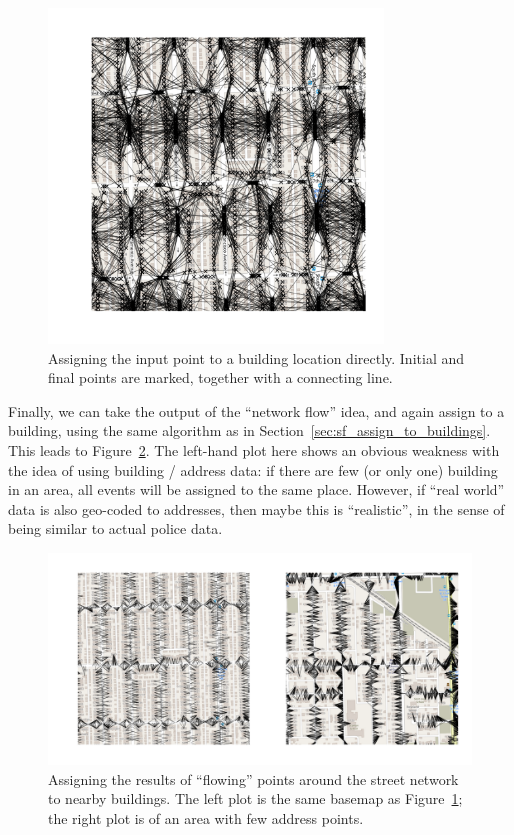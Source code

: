 \documentclass[twoside,a4paper,twocolumn,10pt]{article}
\theoremstyle{plain}
\theoremstyle{definition}
\begin{document}
\begin{figure}
  \includegraphics[width=3.5in]{chicago_buildings_1.png}
  \caption{Assigning the input point to a building location directly.  Initial and final
points are marked, together with a connecting line.}
  \label{fig:chicago_buildings_1}
\end{figure}

Finally, we can take the output of the ``network flow'' idea, and again assign
to a building, using the same algorithm as in Section~\ref{sec:sf_assign_to_buildings}.
This leads to Figure~\ref{fig:chicago_buildings_2}.  The left-hand plot here shows an
obvious weakness with the idea of using building / address data: if there are few (or only one)
building in an area, all events will be assigned to the same place.  However, if ``real world''
data is also geo-coded to addresses, then maybe this is ``realistic'', in the sense of
being similar to actual police data.

\begin{figure}
  \includegraphics[width=\textwidth]{chicago_buildings_after_flow.png}
  \caption{Assigning the results of ``flowing'' points around the street network to
nearby buildings.  The left plot is the same basemap as Figure~\ref{fig:chicago_buildings_1};
the right plot is of an area with few address points.}
  \label{fig:chicago_buildings_2}
\end{figure}
\end{document}
